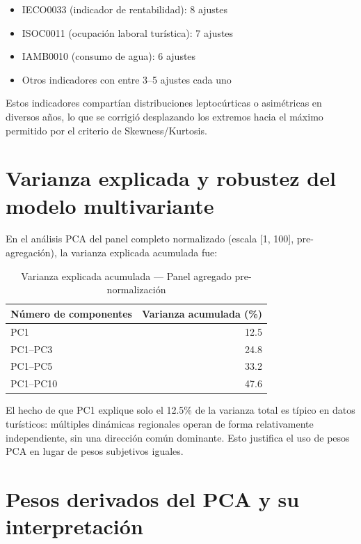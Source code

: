 \begin{itemize}
    \item IECO0033 (indicador de rentabilidad): 8 ajustes
    \item ISOC0011 (ocupación laboral turística): 7 ajustes
    \item IAMB0010 (consumo de agua): 6 ajustes
    \item Otros indicadores con entre 3--5 ajustes cada uno
\end{itemize}

Estos indicadores compartían distribuciones leptocúrticas o asimétricas en diversos años, lo que se corrigió desplazando los extremos hacia el máximo permitido por el criterio de Skewness/Kurtosis.

\section{Varianza explicada y robustez del modelo multivariante}

En el análisis PCA del panel completo normalizado (escala [1, 100], pre-agregación), la varianza explicada acumulada fue:

\begin{table}[H]
    \centering
    \small
    \begin{tabular}{lr}
        \toprule
        \textbf{Número de componentes} & \textbf{Varianza acumulada (\%)} \\
        \midrule
        PC1 & 12.5 \\
        PC1--PC3 & 24.8 \\
        PC1--PC5 & 33.2 \\
        PC1--PC10 & 47.6 \\
        \bottomrule
    \end{tabular}
    \caption{Varianza explicada acumulada — Panel agregado pre-normalización}
    \label{tab:varianza_acum}
\end{table}

El hecho de que PC1 explique solo el 12.5\% de la varianza total es típico en datos turísticos: múltiples dinámicas regionales operan de forma relativamente independiente, sin una dirección común dominante. Esto justifica el uso de pesos PCA en lugar de pesos subjetivos iguales.

\section{Pesos derivados del PCA y su interpretación}


